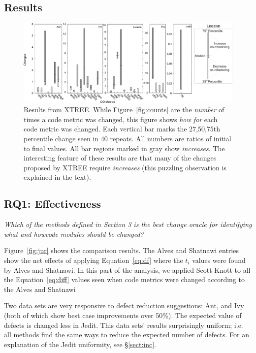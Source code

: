 \documentclass[twocolumn,5p]{elsarticle}
\newcommand{\tion}[1]{\S\ref{sect:#1}}
\newcommand{\fig}[1]{Figure~\ref{fig:#1}}
\newcommand{\eq}[1]{Equation~\ref{eq:#1}}
\theoremstyle{break}
\begin{document}
\begin{itemize}
		
		\section{Results}
		
		
		\begin{figure}[!t]
			\centering
			\includegraphics[width=\linewidth]{figs/changes01.png}
			\caption{Results  from XTREE.
				While \fig{counts} are the {\em number} of times a code metric was changed,
				this  figure shows {\em how far} each code metric was changed. Each vertical bar
				marks the 27,50,75th percentile change seen in 40 repeats.
				All numbers are ratios of initial to final values.
				All bar regions marked in gray show {\em increases}.
				The interesting feature of these results are that many
				of the changes proposed by XTREE require {\em increases}
				(this puzzling observation is explained in the text).}
			\label{fig:changes}
		\end{figure}
		
		
		
		\subsection{RQ1: Effectiveness}
		
		{\em Which of the methods defined in Section 3 is the best change oracle for identifying what and howcode modules should be changed? }
		
		\fig{jur} shows the comparison results.  The Alves and Shatnawi
		entries show the net effects of applying \eq{df} where the $t_i$ values were found by Alves and Shatnawi.
		In this part of the  analysis,
		we applied Scott-Knott to all the \eq{diff} values
		seen when code metrics were changed
		according to the  Alves and Shatnawi
		
		
		Two data sets are very responsive to defect reduction suggestions:
		Ant, and Ivy (both of which show best case improvements over 50\%).
		The  expected value of defects  
		is changed less in Jedit. This data sets' results
		surprisingly uniform; i.e.   all methods
		find the same ways to reduce the expected number of
		defects.   For an explanation of the Jedit uniformity, see \tion{inc}.
		

\end{itemize}
\end{document}
